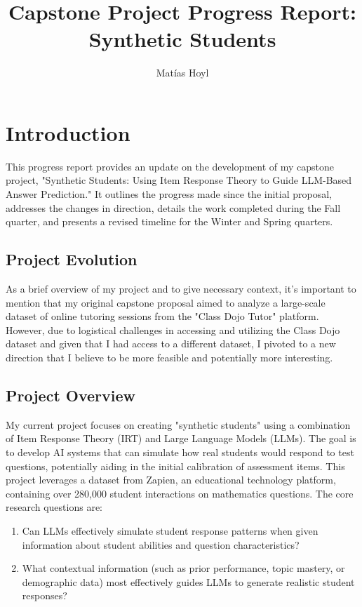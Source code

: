 \documentclass[12pt, letterpaper]{article}
\title{Capstone Project Progress Report: \\ Synthetic Students}
\author{Matías Hoyl}
\begin{document}
\justifying

\maketitle

\section{Introduction}

This progress report provides an update on the development of my capstone project, "Synthetic Students: Using Item Response Theory to Guide LLM-Based Answer Prediction." It outlines the progress made since the initial proposal, addresses the changes in direction, details the work completed during the Fall quarter, and presents a revised timeline for the Winter and Spring quarters.

\subsection{Project Evolution} As a brief overview of my project and to give necessary context, it's important to mention that my original capstone proposal aimed to analyze a large-scale dataset of online tutoring sessions from the "Class Dojo Tutor" platform. However, due to logistical challenges in accessing and utilizing the Class Dojo dataset and given that I had access to a different dataset, I pivoted to a new direction that I believe to be more feasible and potentially more interesting.

\subsection{Project Overview}
My current project focuses on creating "synthetic students" using a combination of Item Response Theory (IRT) and Large Language Models (LLMs). The goal is to develop AI systems that can simulate how real students would respond to test questions, potentially aiding in the initial calibration of assessment items. This project leverages a dataset from Zapien, an educational technology platform, containing over 280,000 student interactions on mathematics questions. The core research questions are:

\begin{enumerate}
    \item Can LLMs effectively simulate student response patterns when given information about student abilities and question characteristics?
    \item What contextual information (such as prior performance, topic mastery, or demographic data) most effectively guides LLMs to generate realistic student responses?
\end{enumerate}
\end{document}
